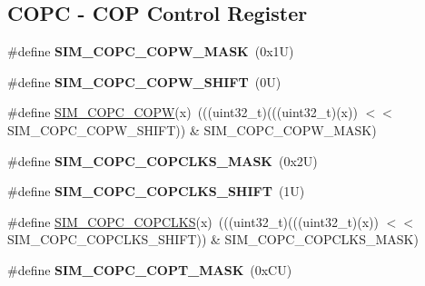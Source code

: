 \subsection*{C\+O\+PC -\/ C\+OP Control Register}
\begin{DoxyCompactItemize}
\item 
\mbox{\label{group___s_i_m___register___masks_gabea5c1af6c493fe6e417dd6c3eba4ad6}} 
\#define {\bfseries S\+I\+M\+\_\+\+C\+O\+P\+C\+\_\+\+C\+O\+P\+W\+\_\+\+M\+A\+SK}~(0x1\+U)
\item 
\mbox{\label{group___s_i_m___register___masks_ga219c76cc0f76e8ba2cbe438cb80cb6cc}} 
\#define {\bfseries S\+I\+M\+\_\+\+C\+O\+P\+C\+\_\+\+C\+O\+P\+W\+\_\+\+S\+H\+I\+FT}~(0\+U)
\item 
\#define \mbox{\hyperlink{group___s_i_m___register___masks_ga7c73ff69bdcf80d5b351e696f0352e91}{S\+I\+M\+\_\+\+C\+O\+P\+C\+\_\+\+C\+O\+PW}}(x)~(((uint32\+\_\+t)(((uint32\+\_\+t)(x)) $<$$<$ S\+I\+M\+\_\+\+C\+O\+P\+C\+\_\+\+C\+O\+P\+W\+\_\+\+S\+H\+I\+FT)) \& S\+I\+M\+\_\+\+C\+O\+P\+C\+\_\+\+C\+O\+P\+W\+\_\+\+M\+A\+SK)
\item 
\mbox{\label{group___s_i_m___register___masks_ga05e787905b2cb2c97a688a31c461235f}} 
\#define {\bfseries S\+I\+M\+\_\+\+C\+O\+P\+C\+\_\+\+C\+O\+P\+C\+L\+K\+S\+\_\+\+M\+A\+SK}~(0x2\+U)
\item 
\mbox{\label{group___s_i_m___register___masks_ga61c1964987078934db4ab11e5358b51a}} 
\#define {\bfseries S\+I\+M\+\_\+\+C\+O\+P\+C\+\_\+\+C\+O\+P\+C\+L\+K\+S\+\_\+\+S\+H\+I\+FT}~(1\+U)
\item 
\#define \mbox{\hyperlink{group___s_i_m___register___masks_ga506deb0bdab5ae7db9285fa7feee762a}{S\+I\+M\+\_\+\+C\+O\+P\+C\+\_\+\+C\+O\+P\+C\+L\+KS}}(x)~(((uint32\+\_\+t)(((uint32\+\_\+t)(x)) $<$$<$ S\+I\+M\+\_\+\+C\+O\+P\+C\+\_\+\+C\+O\+P\+C\+L\+K\+S\+\_\+\+S\+H\+I\+FT)) \& S\+I\+M\+\_\+\+C\+O\+P\+C\+\_\+\+C\+O\+P\+C\+L\+K\+S\+\_\+\+M\+A\+SK)
\item 
\mbox{\label{group___s_i_m___register___masks_gaf9109bf584bb00c7c6bcf002582b2905}} 
\#define {\bfseries S\+I\+M\+\_\+\+C\+O\+P\+C\+\_\+\+C\+O\+P\+T\+\_\+\+M\+A\+SK}~(0x\+C\+U)
\item 

\end{DoxyCompactItemize}
